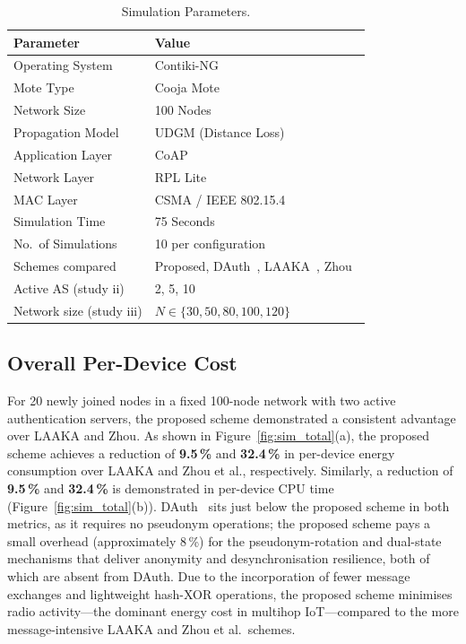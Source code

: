 \begin{table}[!ht]
  \centering
  \caption{Simulation Parameters.}
  \label{tab:simparams}
  \small
  \setlength{\tabcolsep}{5pt}
  \begin{tabular}{ll}
    \toprule
    Parameter & Value \\
    \midrule
    Operating System     & Contiki-NG \\
    Mote Type            & Cooja Mote \\
    Network Size         & 100 Nodes \\
    Propagation Model    & UDGM (Distance Loss) \\
    Application Layer    & CoAP \\
    Network Layer        & RPL Lite \\
    MAC Layer            & CSMA / IEEE 802.15.4 \\
    Simulation Time      & 75 Seconds \\
    No.\ of Simulations  & 10 per configuration \\
    Schemes compared     & Proposed, DAuth~\cite{das2026comsnets}, LAAKA~\cite{ali2024laaka}, Zhou~\cite{zhou2024auth} \\
    Active AS (study ii) & 2, 5, 10 \\
    Network size (study iii) & $N \in \{30, 50, 80, 100, 120\}$ \\
    \bottomrule
  \end{tabular}
\end{table}

\subsection{Overall Per-Device Cost}

For 20 newly joined nodes in a fixed 100-node network with two active authentication
servers, the proposed scheme demonstrated a consistent advantage over LAAKA and Zhou.
As shown in Figure~\ref{fig:sim_total}(a), the proposed scheme achieves a reduction
of \textbf{9.5\,\%} and \textbf{32.4\,\%} in per-device energy consumption
over LAAKA and Zhou et al., respectively.
Similarly, a reduction of \textbf{9.5\,\%} and \textbf{32.4\,\%} is demonstrated
in per-device CPU time (Figure~\ref{fig:sim_total}(b)).
DAuth~\cite{das2026comsnets} sits just below the proposed scheme in both metrics,
as it requires no pseudonym operations; the proposed scheme pays a small overhead
(approximately 8\,\%) for the pseudonym-rotation and dual-state mechanisms that
deliver anonymity and desynchronisation resilience, both of which are absent from DAuth.
Due to the incorporation of fewer message exchanges and lightweight
hash-XOR operations, the proposed scheme minimises radio activity---the dominant
energy cost in multihop IoT---compared to the more message-intensive
LAAKA and Zhou et al.\ schemes.

